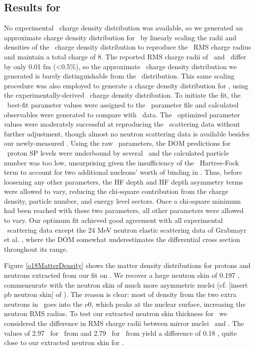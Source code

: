 \subsection{Results for \oEight}
No experimental \oEight\ charge density distribution was available, so we generated
an approximate charge density distribution for \oEight\ by linearly scaling
the radii and densities of the \oSix\ charge density distribution to reproduce the \oEight\ RMS charge
radius and maintain a total charge of 8. The reported RMS charge radii of \oSix\ and \oEight\ differ by only
0.01 fm (<0.5\%), so the approximate \oEight\ charge density distribution we generated is barely
distinguishable from the \oSix\ distribution. This same scaling procedure was also employed to
generate a charge density distribution for \snTwelve, using the
experimentally-derived \snFour\ charge density distribution. To initiate the fit, the \oSix\ best-fit parameter values
were assigned to the \oEight\ parameter file and calculated observables were generated to compare
with \oEight\ data. The \oSix\ optimized parameter values were moderately successful at reproducing
the \oEight\ scattering data without further adjustment, though almost no neutron scattering data is
available besides our newly-measured \tot. Using the raw \oSix\ parameters, the DOM predictions for
\oEight\ proton SP levels were underbound by several \mega\electronvolt\
and the calculated particle number was too low, unsurprising
given the insufficiency of the \oSix\ Hartree-Fock term to account for 
two additional nucleons' worth of binding in \oEight. Thus, before
loosening any other parameters, the HF depth and HF depth asymmetry terms were allowed to vary,
reducing the chi-square contribution from the charge density, particle number, and energy level
sectors. Once a chi-square minimum had been reached with these two parameters, all other 
parameters were allowed to vary. Our optimum fit achieved good agreement with all
experimental \oEight\ scattering data except the 24 MeV neutron elastic scattering data
of Grabmayr et al. \cite{Grabmayr1980}, where the DOM somewhat underestimates
the differential cross section throughout its range.

Figure \ref{o18MatterDensity} shows the matter density distributions for protons
and neutrons extracted from our fit on \oEight. We recover a large neutron skin of
0.197 \femto\meter, commensurate with the neutron skin of much more asymmetric
nuclei (cf. [insert pb neutron skin] of \pbEight). The reason is clear: most
of density from the two extra neutrons in \oEight\ goes into the
$\nu$0\dFive, which peaks at the nuclear surface, increasing the neutron RMS
radius. To test our extracted neutron skin thickness for \oEight\, we considered 
the difference in RMS charge radii between mirror nuclei \neEight\ and \oEight.
The values of 2.97 \femto\meter\ for \neEight\ from \cite{Marinova2011} and
2.79 \femto\meter\ for \oEight\ from \cite{DeVries} yield a difference of 0.18
\femto\meter, quite close to our extracted neutron skin for \oEight.

